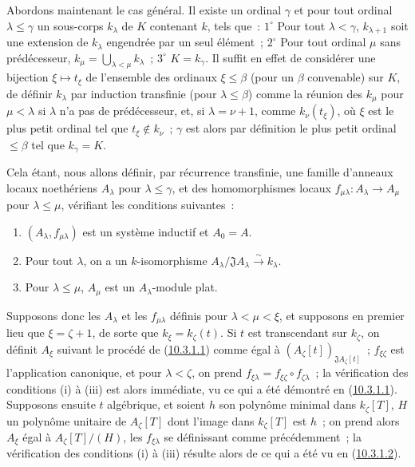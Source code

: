 \begin{env}[10.3.1.4]
\label{0.10.3.1.4-fr}
Abordons maintenant le cas général. Il existe un ordinal $\gamma$ et pour
tout ordinal $\lambda\leq\gamma$ un sous-corps $k_\lambda$ de $K$ contenant
$k$, tels que~: $1^\circ$ Pour tout $\lambda<\gamma$, $k_{\lambda+1}$ soit
une extension de $k_\lambda$ engendrée par un seul élément~; $2^\circ$ Pour
tout ordinal $\mu$ sans prédécesseur,
$k_\mu=\bigcup_{\lambda<\mu}k_\lambda$~; $3^\circ$ $K=k_\gamma$. Il suffit en
effet de considérer une bijection $\xi\mapsto t_\xi$ de l'ensemble des
ordinaux $\xi\leq\beta$ (pour un $\beta$ convenable) sur $K$, de définir
$k_\lambda$ par induction transfinie (pour $\lambda\leq\beta$) comme la
réunion des $k_\mu$ pour $\mu<\lambda$ si $\lambda$ n'a pas de prédécesseur,
et, si $\lambda=\nu+1$, comme $k_\nu(t_\xi)$, où $\xi$ est le plus petit
ordinal tel que $t_\xi\notin k_\nu$~; $\gamma$ est alors par définition le plus
petit ordinal $\leq\beta$ tel que $k_\gamma=K$.

Cela étant, nous allons définir, par récurrence transfinie, une famille
d'anneaux locaux noethériens $A_\lambda$ pour $\lambda\leq\gamma$, et des
homomorphismes locaux $f_{\mu\lambda}:A_\lambda\to A_\mu$ pour
$\lambda\leq\mu$, vérifiant les conditions suivantes~:
\begin{enumerate}
  \item[(i)] $(A_\lambda,f_{\mu\lambda})$ est un système inductif et $A_0=A$.
  \item[(ii)] Pour tout $\lambda$, on a un $k$-isomorphisme
    $A_\lambda/\mathfrak J A_\lambda\xrightarrow{\sim}k_\lambda$.
  \item[(iii)] Pour $\lambda\leq\mu$, $A_\mu$ est un $A_\lambda$-module plat.
\end{enumerate}

Supposons donc les $A_\lambda$ et les $f_{\mu\lambda}$ définis pour
$\lambda<\mu<\xi$, et supposons en premier lieu que $\xi=\zeta+1$, de sorte
que $k_\xi=k_\zeta(t)$. Si $t$ est transcendant sur $k_\zeta$, on définit
$A_\xi$ suivant le procédé de (\hyperref[0.10.3.1.1-fr]{10.3.1.1}) comme
égal à $(A_\zeta[t])_{\mathfrak J A_\zeta[t]}$~;
$f_{\xi\zeta}$ est l'application canonique, et pour $\lambda<\zeta$, on prend
$f_{\xi\lambda}=f_{\xi\zeta}\circ f_{\zeta\lambda}$~; la vérification des
conditions (i) à (iii) est alors immédiate, vu ce qui a été démontré en
(\hyperref[0.10.3.1.1-fr]{10.3.1.1}). Supposons ensuite $t$ algébrique, et
soient $h$ son polynôme minimal dans $k_\zeta[T]$, $H$ un polynôme unitaire de
$A_\zeta[T]$ dont l'image dans $k_\zeta[T]$ est $h$~; on prend alors $A_\xi$
égal à $A_\zeta[T]/(H)$, les $f_{\xi\lambda}$ se définissant comme
précédemment~; la vérification des conditions (i) à (iii) résulte alors de
ce qui a été vu en (\hyperref[0.10.3.1.2-fr]{10.3.1.2}).


\end{env}
